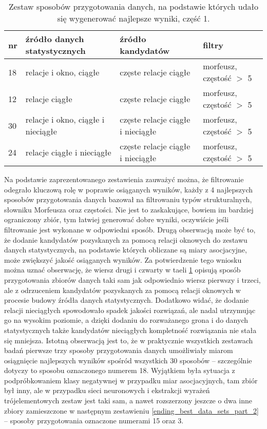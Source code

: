 \begin{table}[h!]
\centering
\begin{tabular}{ l | l | l | l }
	\toprule
	\textbf{nr} 	& \textbf{źródło danych statystycznych}			& \textbf{źródło kandydatów}		& \textbf{filtry}					\\
	\midrule
	18	& relacje i okno, ciągłe				& częste relacje ciągłe	& morfeusz, częstość $>$ 5	\\
	12	& relacje ciągłe						& częste relacje ciągłe & morfeusz, częstość $>$ 5	\\
	30	& relacje i okno, ciągłe i nieciągłe	& częste relacje ciągłe	i nieciągłe	& morfeusz, częstość $>$ 5	\\
	24	& relacje ciągłe i nieciągłe			& częste relacje ciągłe i nieciągłe	& morfeusz, częstość $>$ 5	\\
	\bottomrule
\end{tabular}
\caption[Zestaw sposobów przygotowania danych, na podstawie których udało się wygenerować najlepsze wyniki, część 1]{Zestaw sposobów przygotowania danych, na podstawie których udało się wygenerować najlepsze wyniki, część 1.}
\label{ending_best_data_sets_part_1}
\end{table}

Na podstawie zaprezentowanego zestawienia zauważyć można, że filtrowanie odegrało kluczową rolę w poprawie osiąganych wyników, każdy z 4 najlepszych sposobów przygotowania danych bazował na filtrowaniu typów strukturalnych, słowniku Morfeusza oraz częstości.
Nie jest to zaskakujące, bowiem im bardziej ograniczony zbiór, tym łatwiej generować dobre wyniki, oczywiście jeśli filtrowanie jest wykonane w odpowiedni sposób.
Drugą obserwacją może być to, że dodanie kandydatów pozyskanych za pomocą relacji oknowych do zestawu danych statystycznych, na podstawie których obliczane są miary asocjacyjne, może zwiększyć jakość osiąganych wyników.
Za potwierdzenie tego wniosku można uznać obserwację, że wiersz drugi i czwarty w taeli \ref{ending_best_data_sets_part_1} opisują sposób przygotowania zbiorów danych taki sam jak odpowiednio wiersz pierwszy i trzeci, ale z odrzuceniem kandydatów pozyskanych za pomocą relacji oknowych w procesie budowy źródła danych statystycznych.
Dodatkowo widać, że dodanie relacji nieciągłych spowodowało spadek jakości rozwiązań, ale nadal utrzymując go na wysokim poziomie, a dzięki dodaniu do rozważanego grona i do danych statystycznych także kandydatów nieciągłych kompletność rozwiązania nie stała się mniejsza.
Istotną obserwacją jest to, że w praktycznie wszystkich zestawach badań pierwsze trzy sposoby przygotowania danych umożliwiały miarom osiągnięcie najlepszych wyników spośród wszystkich 30 sposobów -- szczególnie dotyczy to sposobu oznaczonego numerem 18.
Wyjątkiem była sytuacja z podpróbkowaniem klasy negatywnej w przypadku miar asocjacyjnych, tam zbiór był inny, ale w przypadku sieci neuronowych i ekstrakcji wyrażeń trójelementowych zestaw jest taki sam, a nawet rozszerzony jeszcze o dwa inne zbiory zamieszczone w następnym zestawieniu \ref{ending_best_data_sets_part_2} -- sposoby przygotowania oznaczone numerami 15 oraz 3.

